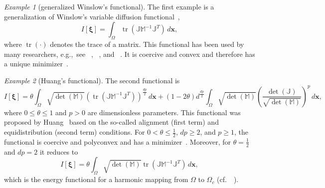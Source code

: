 \documentclass[american]{scrartcl}
\providecommand{\acite}[1]{\citeauthor{#1}~\cite{#1}}
\providecommand{\V}[1]{\boldsymbol{#1}}
\providecommand{\dx}{\,d\V{x}}
\providecommand{\M}{\mathbb{M}}
\providecommand{\J}{\mathbb{J}}
\providecommand{\JMJ}{\J \M^{-1}\J^T}
\theoremstyle{remark}
\newtheorem{example}{\hspace{1ex}Example}[section]
\begin{document}
\begin{example}[generalized Winslow's functional]
\label{ex:Winslow}
The first example is a generalization of Winslow's variable diffusion functional~\cite{Win81},
\begin{equation}
   I[\V{\xi}] = \int_\Omega \operatorname{tr}(\JMJ) \dx,
   \label{eq:fun:winslow}
\end{equation}
where $\operatorname{tr}(\cdot)$ denotes the trace of a matrix.
This functional has been used by many researchers, e.g.,\ see \citeauthor{HR97b}~\cite{HR97b, HR99}, \acite{LTZ01}, and \acite{BMR01}.
It is coercive and convex and therefore has a unique minimizer~\cite[Example 6.2.1]{HR11}.
\end{example}

\begin{example}[Huang's functional]
\label{ex:Huang}
The second functional is
\begin{equation}
   I[\V{\xi}]  
   = \theta \int_\Omega \sqrt{\det(\M)} {\left(\operatorname{tr}(\JMJ) \right)}^{\frac{dp}{2}} \dx
   + (1 - 2 \theta) d^{\frac{dp}{2}} \int_\Omega \sqrt{\det(\M)}
            {\left( \frac{\det(\J)}{\sqrt{\det(\M)}}\right)}^{p} \dx,
   \label{eq:fun:huang}
\end{equation}
where $0 \le \theta \le 1$ and $p > 0$ are dimensionless parameters.
This functional was proposed by Huang~\cite{Hua01b} based on the so-called alignment (first term) and equidistribution (second term) conditions.
For $0 < \theta \le \frac{1}{2}$, $d p \ge 2$, and $p \ge 1$, the functional is coercive and polyconvex and has a minimizer~\cite[Example 6.2.2]{HR11}.
Moreover, for $\theta = \frac{1}{2}$ and $d p = 2$ it reduces to
\[
   I[\V{\xi}]  = \theta \int_\Omega \sqrt{\det(\M)} \operatorname{tr}(\JMJ) \dx,
\]
which is the energy functional for a harmonic mapping from $\Omega$ to $\Omega_c$ (cf.~\acite{Dvi91}).
\end{example}

\vspace{1ex}
\end{document}

